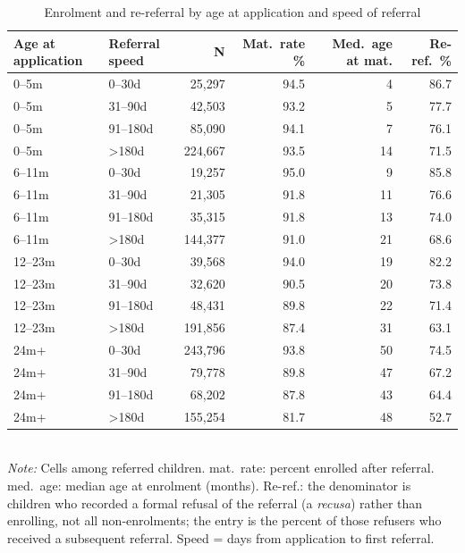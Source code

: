 \begin{table}[htbp]\centering
\caption{Enrolment and re-referral by age at application and speed of referral}
\label{tab:C4}
\footnotesize
\setlength{\tabcolsep}{4pt}
\begin{tabular}{llrrrr}
\toprule
Age at application & Referral speed & N & Mat.\ rate \% & Med.\ age at mat. & Re-ref.\ \% \\
\midrule
0--5m & 0--30d & 25,297 & 94.5 & 4 & 86.7 \\
0--5m & 31--90d & 42,503 & 93.2 & 5 & 77.7 \\
0--5m & 91--180d & 85,090 & 94.1 & 7 & 76.1 \\
0--5m & >180d & 224,667 & 93.5 & 14 & 71.5 \\
6--11m & 0--30d & 19,257 & 95.0 & 9 & 85.8 \\
6--11m & 31--90d & 21,305 & 91.8 & 11 & 76.6 \\
6--11m & 91--180d & 35,315 & 91.8 & 13 & 74.0 \\
6--11m & >180d & 144,377 & 91.0 & 21 & 68.6 \\
12--23m & 0--30d & 39,568 & 94.0 & 19 & 82.2 \\
12--23m & 31--90d & 32,620 & 90.5 & 20 & 73.8 \\
12--23m & 91--180d & 48,431 & 89.8 & 22 & 71.4 \\
12--23m & >180d & 191,856 & 87.4 & 31 & 63.1 \\
24m+ & 0--30d & 243,796 & 93.8 & 50 & 74.5 \\
24m+ & 31--90d & 79,778 & 89.8 & 47 & 67.2 \\
24m+ & 91--180d & 68,202 & 87.8 & 43 & 64.4 \\
24m+ & >180d & 155,254 & 81.7 & 48 & 52.7 \\
\bottomrule
\end{tabular}
\\[3pt]{\footnotesize \textit{Note:} Cells among referred children. mat.\ rate: percent enrolled after referral. med.\ age: median age at enrolment (months). Re-ref.: the denominator is children who recorded a formal refusal of the referral (a \emph{recusa}) rather than enrolling, not all non-enrolments; the entry is the percent of those refusers who received a subsequent referral. Speed = days from application to first referral.}
\end{table}
